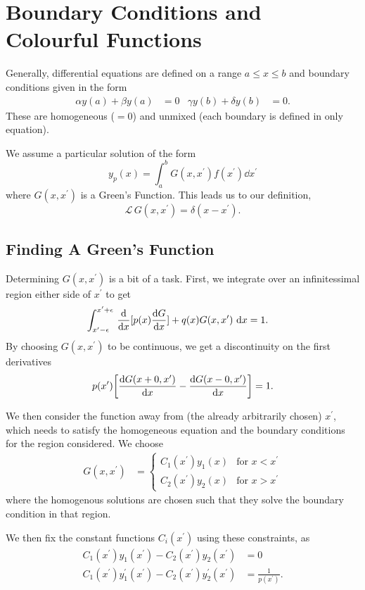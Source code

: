 \documentclass[a4paper,12pt,parskip=full,BCOR=1cm]{scrreprt}
\renewcommand{\leq}{\leqslant}
\begin{document}
\section{Boundary Conditions and Colourful Functions}
Generally, differential equations are defined on a range $a \leq x \leq b$ and boundary conditions given in the form
\begin{align*}
 \alpha y(a) + \beta y(a) & = 0 & \gamma y(b) + \delta y(b) & = 0.
\end{align*}
These are homogeneous ($=0$) and unmixed (each boundary is defined in only equation).

We assume a particular solution of the form
$$ y_p(x) = \int_a^b G(x,x^\prime)f(x^\prime)\dd{x^\prime}$$ where $G(x,x^\prime)$ is a Green's Function.
This leads us to our definition,
$$\mathcal{L}\,G(x,x^\prime)=\delta(x-x^\prime).$$
\subsection*{Finding A Green's Function}
Determining $G(x,x^\prime)$ is a bit of a task.
First, we integrate over an infinitessimal region either side of $x^\prime$ to get
\begin{align*}
 \int_{x^\prime-\epsilon}^{x^\prime + \epsilon}\,\dv{x}[p(x)\dv{G}{x}]+q(x)G(x,x^\prime)\,\dd{x} & = 1.
\end{align*}
By choosing $G(x,x^\prime)$ to be continuous, we get a discontinuity on the first derivatives
\begin{equation*}
 p(x^\prime)\qty[\dv{G(x+0,x^\prime)}{x} - \dv{G(x-0,x^\prime)}{x}] = 1.
\end{equation*}

We then consider the function away from (the already arbitrarily chosen) $x^\prime$, which needs to satisfy the homogeneous equation and the boundary conditions for the region considered.
We choose
\begin{align*}
 G(x,x^\prime) & =
 \begin{cases}
  C_1(x^\prime)y_1(x) & \text{for } x< x^\prime \\
  C_2(x^\prime)y_2(x) & \text{for } x> x^\prime
 \end{cases}
\end{align*}
where the homogenous solutions are chosen such that they solve the boundary condition in that region.

We then fix the constant functions $C_i(x^\prime)$ using these constraints, as
\begin{align*}
 C_1(x^\prime)y_1(x^\prime) - C_2(x^\prime)y_2(x^\prime)               & = 0                      \\
 C_1(x^\prime)y^\prime_1(x^\prime) - C_2(x^\prime)y^\prime_2(x^\prime) & = \frac{1}{p(x^\prime)}.
\end{align*}
\end{document}
